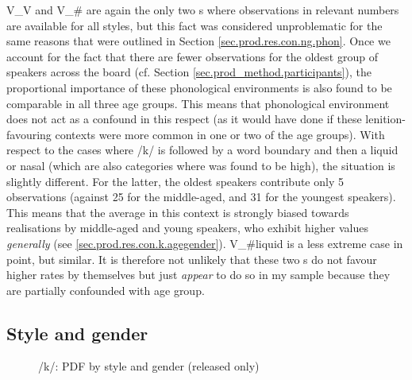 V\_V and V\_\# are again the only two s where observations in relevant numbers are available for all styles, but this fact was considered unproblematic for the same reasons that were outlined in Section \ref{sec.prod.res.con.ng.phon}.
Once we account for the fact that there are fewer observations for the oldest group of speakers across the board (cf. Section \ref{sec.prod_method.participants}), the proportional importance of these phonological environments is also found to be comparable in all three age groups.
This means that phonological environment does not act as a confound in this respect (as it would have done if these lenition-favouring contexts were more common in one or two of the age groups).
With respect to the cases where /k/ is followed by a word boundary and then a liquid or nasal (which are also categories where  was found to be high), the situation is slightly different.
For the latter, the oldest speakers contribute only 5 observations (against 25 for the middle-aged, and 31 for the youngest speakers).
This means that the average  in this context is strongly biased towards realisations by middle-aged and young speakers, who exhibit higher  values \emph{generally} (see \ref{sec.prod.res.con.k.agegender}).
V\_\#liquid is a less extreme case in point, but similar.
It is therefore not unlikely that these two s do not favour higher  rates by themselves but just \emph{appear} to do so in my sample because they are partially confounded with age group.

\subsection{Style and gender}
\label{sec.prod.res.con.k.stylegender}

\begin{figure}[h]
	\centering
		\resizebox{.49\linewidth}{!}{} 
	\caption{/k/: PDF by style and gender (released only)}
	\label{fig.box.k.stylegender}
\end{figure}

